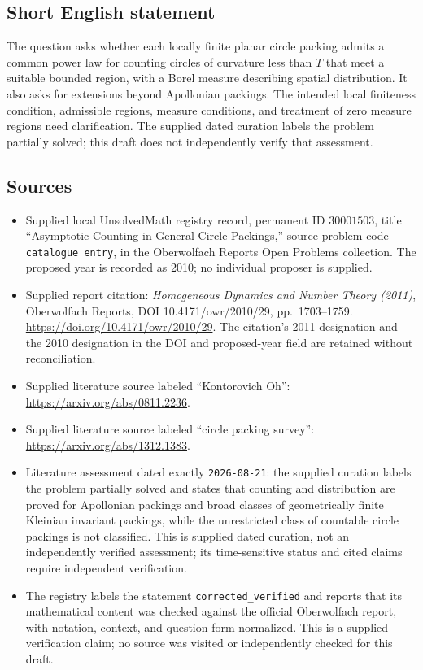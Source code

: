 \documentclass[11pt]{article}
\begin{document}
\subsection{Short English statement}
The question asks whether each locally finite planar circle packing admits a common power law for counting circles of curvature less than \(T\) that meet a suitable bounded region, with a Borel measure describing spatial distribution. It also asks for extensions beyond Apollonian packings. The intended local finiteness condition, admissible regions, measure conditions, and treatment of zero measure regions need clarification. The supplied dated curation labels the problem partially solved; this draft does not independently verify that assessment.
\subsection{Sources}
\begin{itemize}
\item Supplied local UnsolvedMath registry record, permanent ID \(30001503\), title ``Asymptotic Counting in General Circle Packings,'' source problem code \texttt{catalogue entry}, in the Oberwolfach Reports Open Problems collection. The proposed year is recorded as 2010; no individual proposer is supplied.
\item Supplied report citation: \emph{Homogeneous Dynamics and Number Theory (2011)}, Oberwolfach Reports, DOI 10.4171/owr/2010/29, pp.\ 1703--1759. \url{https://doi.org/10.4171/owr/2010/29}. The citation's 2011 designation and the 2010 designation in the DOI and proposed-year field are retained without reconciliation.
\item Supplied literature source labeled ``Kontorovich Oh'': \url{https://arxiv.org/abs/0811.2236}.
\item Supplied literature source labeled ``circle packing survey'': \url{https://arxiv.org/abs/1312.1383}.
\item Literature assessment dated exactly \texttt{2026-08-21}: the supplied curation labels the problem partially solved and states that counting and distribution are proved for Apollonian packings and broad classes of geometrically finite Kleinian invariant packings, while the unrestricted class of countable circle packings is not classified. This is supplied dated curation, not an independently verified assessment; its time-sensitive status and cited claims require independent verification.
\item The registry labels the statement \texttt{corrected\_verified} and reports that its mathematical content was checked against the official Oberwolfach report, with notation, context, and question form normalized. This is a supplied verification claim; no source was visited or independently checked for this draft.
\end{itemize}
\end{document}
